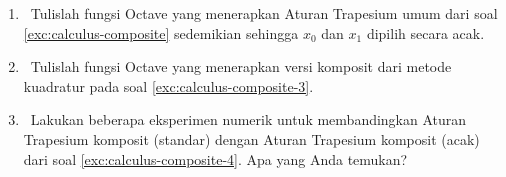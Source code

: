 \begin{enumerate}
\begin{enumerate}
\item \label{exc:calculus-composite-22}${\displaystyle \int_{0}^{2\pi}x\sin(x^{2})dx}$ \hasananswer 
\item ${\displaystyle \int_{0.1}^{2}\frac{1}{x}\,dx}$
\item ${\displaystyle \int_{0}^{2}x^{2}\ln(x^{2}+1)\,dx}$
\end{enumerate}
CATATAN: $\int_{0}^{2}x^{2}\ln(x^{2}+1)\,dx=\frac{24\ln(5)-6\tan^{-1}(2)-4}{9}$.
\item \label{exc:calculus-composite-3}\octave\ Tulislah fungsi Octave
yang menerapkan Aturan Trapesium umum dari soal \ref{exc:calculus-composite}
sedemikian sehingga $x_{0}$ dan $x_{1}$ dipilih secara acak.
\item \octave\ \label{exc:calculus-composite-4}Tulislah fungsi Octave
yang menerapkan versi komposit dari metode kuadratur pada soal \ref{exc:calculus-composite-3}.
\item \octave\ Lakukan beberapa eksperimen numerik untuk membandingkan
Aturan Trapesium komposit (standar) dengan Aturan Trapesium komposit
(acak) dari soal \ref{exc:calculus-composite-4}. Apa yang Anda temukan?
\end{enumerate}
\finishexercises 
